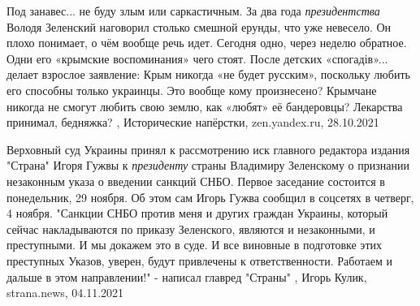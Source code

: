 Под занавес...  не буду злым или саркастичным. За два года \emph{президентства} Володя
Зеленский наговорил столько смешной ерунды, что уже невесело. Он плохо
понимает, о чём вообще речь идет. Сегодня одно, через неделю обратное. Одни его
«крымские воспоминания» чего стоят.  После детских «спогадів»... делает
взрослое заявление: Крым никогда «не будет русским», поскольку любить его
способны только украинцы. Это вообще кому произнесено? Крымчане никогда не
смогут любить свою землю, как «любят» её бандеровцы? Лекарства принимал,
бедняжка?
, 
Исторические напёрстки, zen.yandex.ru, 28.10.2021

Верховный суд Украины принял к рассмотрению иск главного редактора издания
"Страна" Игоря Гужвы к \emph{президенту} страны Владимиру Зеленскому о
признании незаконным указа о введении санкций СНБО. Первое заседание состоится
в понедельник, 29 ноября.  Об этом сам Игорь Гужва сообщил в соцсетях в
четверг, 4 ноября.  "Санкции СНБО против меня и других граждан Украины, который
сейчас накладываются по приказу Зеленского, являются и незаконными, и
преступными. И мы докажем это в суде. И все виновные в подготовке этих
преступных Указов, уверен, будут привлечены к ответственности. Работаем и
дальше в этом направлении!" - написал главред "Страны"
, 
Игорь Кулик, strana.news, 04.11.2021
